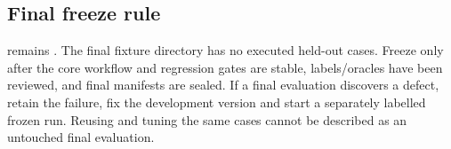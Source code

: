 \subsection{Final freeze rule}
 remains . The final
fixture directory has no executed held-out cases. Freeze only after the core
workflow and regression gates are stable, labels/oracles have been reviewed,
and final manifests are sealed. If a final evaluation discovers a defect,
retain the failure, fix the development version and start a separately labelled
frozen run. Reusing and tuning the same cases cannot be described as an untouched
final evaluation.
